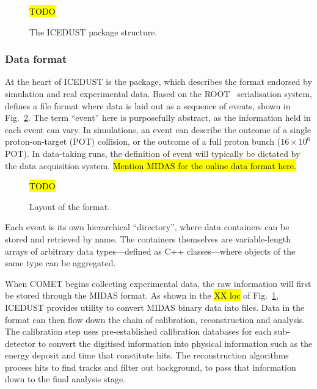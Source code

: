 \begin{figure}
    \centering
    \hl{TODO}
    \caption{The ICEDUST package structure.}
    \label{fig:icedust_schematic}
\end{figure}

\subsubsection{Data format}
At the heart of ICEDUST is the \oaEvent package, which describes the format endorsed by simulation and real experimental data. Based on the ROOT~\cite{BRUN199781} serialisation system, \oaEvent defines a file format where data is laid out as a sequence of events, shown in Fig.~\ref{fig:oaEvent}. The term ``event'' here is purposefully abstract, as the information held in each event can vary. In simulations, an event can describe the outcome of a single proton-on-target (POT) collision, or the outcome of a full proton bunch ($16\times10^6$ POT). 
In data-taking runs, the definition of event will typically be dictated by the data acquisition system.  %
\hl{Mention MIDAS for the online data format here.}

\begin{figure}
    \centering
    \hl{TODO}
    \caption{Layout of the \oaEvent format.}
    \label{fig:oaEvent}
\end{figure}

Each event is its own hierarchical ``directory'', where data containers can be stored and retrieved by name. The containers themselves are variable-length arrays of arbitrary data types---defined as C++ classes---where objects of the same type can be aggregated.




When COMET begins collecting experimental data, the raw information will first be stored through the MIDAS format. 
As shown in the \hl{XX loc} of Fig.~\ref{fig:icedust_schematic}, ICEDUST provides utility to convert MIDAS binary data into \oaEvent files. Data in the \oaEvent format can then flow down the chain of calibration, reconstruction and analysis.
The calibration step uses pre-established calibration databases for each sub-detector to convert the digitised information into physical information such as the energy deposit and time that constitute hits. The reconstruction algorithms process hits to find tracks and filter out background, to pass that information down to the final analysis stage.


